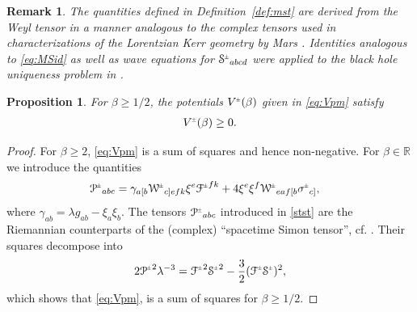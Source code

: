 \documentclass[a4paper,11pt,reqno]{amsart}
\newcommand{\Scal}{\mathop{\rm Scal}}
\theoremstyle{plain}
\newtheorem{prop}[thm]{Proposition}
\newtheorem{remark}[thm]{Remark}
\newcommand{\PM}[1]{{{#1}^{\hspace{-.5pt}\scaleto{\pm}{3.5pt}}}}
\def\Wcal{\mathcal{W}}
\def\Fcal{\mathcal{F}}
\def\Scal{\mathcal{S}}
\numberwithin{equation}{section}
\begin{document}
\begin{remark} 
The quantities defined in Definition~\ref{def:mst} are derived from the Weyl tensor in a manner analogous to the complex tensors used in characterizations of the Lorentzian Kerr geometry by 
%
Mars \cite{MR1701088}.
Identities analogous to \eqref{eq:MSid} as well as wave equations for $\PM{\Scal}_{abcd}$ were applied to the black hole uniqueness problem in 
%
\cite{MR2672799, MR2461426}. 
\end{remark} 

\begin{prop}\label{prop:V(beta)} 
For $\beta \geq 1/2$, the potentials $\PM{V}(\beta)$ given in \eqref{eq:Vpm} satisfy
\begin{align}
\PM{V}(\beta) \geq 0.
\end{align}
\end{prop}
\begin{proof}
For $\beta \geq 2$, \eqref{eq:Vpm} is a sum of squares and hence non-negative. For  $\beta \in \mathbb{R}$ we introduce the
quantities 
\begin{align}
\label{stst}
\PM{\mathcal{P}}_{abc} ={}&  \gamma_{a[b}\PM{\Wcal}_{c]efk} \xi^{e} \PM{\Fcal}^{fk}  + 4 \xi^{e} \xi^{f} \PM{\Wcal}_{eaf[b}  \PM{\sigma}_{c]},
\end{align}
where $ \gamma_{ab}= \lambda g_{ab} -  \xi_{a} \xi_{b}$. 
The tensors $\PM{\mathcal{P}}_{abc}$ introduced in \eqref{stst} are  the  Riemannian counterparts of the (complex)  ``spacetime Simon tensor'', cf. \cite[Definition 1]{MR1701088}. 
Their squares decompose into 
\begin{align}
2 \PM{\mathcal{P}}^2 \lambda^{-3} = \PM{\Fcal}^2 \PM{\Scal}^2 -\frac{3}{2} (\PM{\Fcal}\PM{\Scal})^2, 
\end{align}
which shows that \eqref{eq:Vpm}, is a sum of squares for $\beta \geq 1/2$.
\end{proof}
\end{document}
